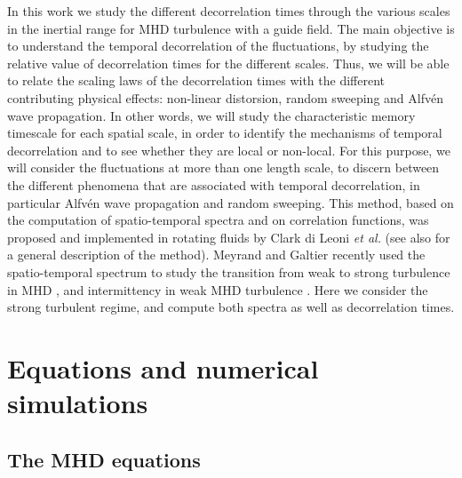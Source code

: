 In this work we study the different decorrelation times through the
various scales in the inertial range for MHD turbulence with a guide
field. The main objective is to understand the temporal decorrelation
of the fluctuations, by studying the relative value of decorrelation
times for the different scales. Thus, we will be able to relate the
scaling laws of the decorrelation times with the different
contributing physical effects: non-linear distorsion, random sweeping
and Alfv\'en wave propagation. In other words, we will study the
characteristic memory timescale for each spatial scale, in order to
identify the mechanisms of temporal decorrelation and to see whether
they are local or non-local. For this purpose, we will consider the
fluctuations at more than one length scale, to discern between the
different phenomena that are associated with temporal decorrelation,
in particular Alfv\'en wave propagation and random sweeping. This
method, based on the computation of spatio-temporal spectra and on
correlation functions, was proposed and implemented in rotating fluids
by Clark di Leoni {\it et al.}
\cite{clark_di_leoni_quantification_2014} (see also
\cite{clark_di_leoni_spatio-temporal_2015} for a general description
of the method). Meyrand and Galtier recently used the spatio-temporal
spectrum to study the transition from weak to strong turbulence in MHD
\cite{meyrand_direct_2016}, and intermittency in weak MHD turbulence
\cite{meyrand_weak_2015}. Here we consider the strong turbulent
regime, and compute both spectra as well as decorrelation times.


\section{Equations and numerical simulations}\label{sec_EqNumSim}

\subsection{The MHD equations}\label{sec_eq}

